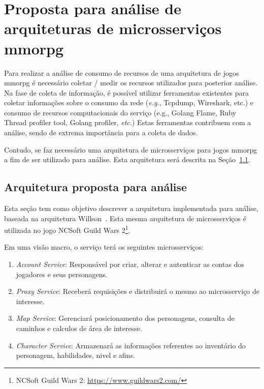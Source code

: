 \chapter{Proposta para análise de arquiteturas de microsserviços \ac{mmorpg}}
\label{cap3}

Para realizar a análise de consumo de recursos de uma arquitetura de jogos \ac{mmorpg} é necessário coletar / medir os recursos utilizados para posterior análise.
%
Na fase de coleta de informação, é possível utilizar ferramentas existentes para coletar informações sobre o consumo da rede (\textit{e.g.}, Tcpdump, Wireshark, etc.) e consumo de recursos computacionais do serviço (e.g., Golang Flame, Ruby Thread profiler tool, Golang profiler, \textit{etc.})
%
Estas ferramentas contribuem com a análise, sendo de extrema importância para a coleta de dados.



Contudo, se faz necessário uma arquitetura de microsserviços para jogos \ac{mmorpg} a fim de ser utilizado para análise.
%
Esta arquitetura será descrita na Seção~\ref{sec:arquitetura_proposta}.


\section{Arquitetura proposta para análise}
\label{sec:arquitetura_proposta}

Esta seção tem como objetivo descrever a arquitetura implementada para análise, baseada na arquitetura Willson~\cite{stephenclarkewillson2017}.
%
Esta mesma arquitetura de microsserviços é utilizada no jogo NCSoft Guild Wars 2\footnote{NCSoft Guild Wars 2: \url{https://www.guildwars2.com/}}.

Em uma visão macro, o serviço terá os seguintes microsserviços:

\begin{enumerate}
  \item{\textit{Account Service}}: Responsável por criar, alterar e autenticar as contas dos jogadores e seus personagens.
  \item{\textit{Proxy Service}}: Receberá requisições e distribuirá o mesmo ao microsserviço de interesse.
  \item{\textit{Map Service}}: Gerenciará posicionamento dos personagens, consulta de caminhos e calculos de área de interesse.
  \item{\textit{Character Service}}: Armazenará as informações referentes ao inventário do personagem, habilidades, nivel e afins.
\end{enumerate}
